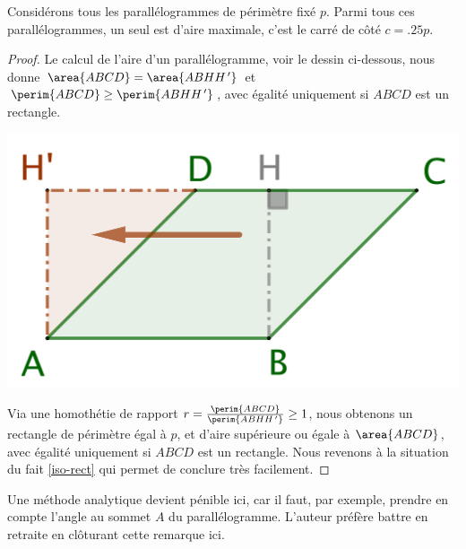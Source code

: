 \begin{fact} \label{iso-para}
    Considérons tous les parallélogrammes de périmètre fixé $p$. Parmi tous ces parallélogrammes, un seul est d'aire maximale, c'est le carré de côté $c = \num{.25} p$.
\end{fact}


\begin{proof}
    Le calcul de l'aire d'un parallélogramme, voir le dessin ci-dessous, nous donne
    $\area{ABCD} = \area{ABHH^{\,\prime}}$ et
    $\perim{ABCD} \geq \perim{ABHH^{\,\prime}}$,
    avec égalité uniquement si $ABCD$ est un rectangle.

    \begin{center}
        \includegraphics[scale=.4]{para-2-rect.png}
    \end{center}

    Via une homothétie de rapport $r = \frac{\perim{ABCD}}{\perim{ABHH^{\,\prime}}} \geq 1$, nous obtenons un rectangle
    de périmètre égal à $p$,
    et d'aire supérieure ou égale à $\area{ABCD}$,
    avec égalité uniquement si $ABCD$ est un rectangle.
    Nous revenons à la situation du fait \ref{iso-rect} qui permet de conclure très facilement.
\end{proof}




\begin{remark}
    Une méthode analytique devient pénible ici, car il faut, par exemple, prendre en compte l'angle au sommet $A$ du parallélogramme. L'auteur préfère battre en retraite en clôturant cette remarque ici.
\end{remark}
